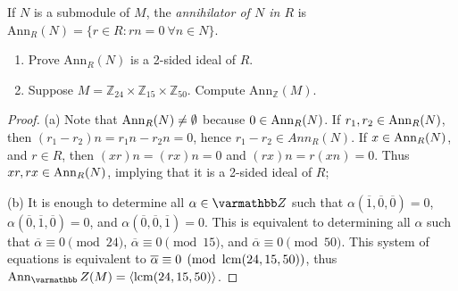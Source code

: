 \documentclass[10pt,oneside,openany]{memoir}
\begin{document}
\begin{exercise}
	If $N$ is a submodule of $M$, the \textit{annihilator of $N$ in $R$} is
$\mathrm{Ann}_R(N)=\{r\in R:rn=0\ \forall n\in N\}$.
	\mbox{}
	\begin{enumerate}[label = (\alph*),itemsep=1pt,topsep=3pt]
		\item Prove $\mathrm{Ann}_R(N)$ is a 2-sided ideal of $R$. 
		\item Suppose $M=\mathbb{Z}_{24}\times\mathbb{Z}_{15}\times\mathbb{Z}_{50}$. Compute $\mathrm{Ann}_{\mathbb{Z}}(M)$.
	\end{enumerate}
\end{exercise}
{\color{blue}

	\begin{proof}
		(a) Note that $\operatorname{Ann}_R(N) \neq \emptyset$ because $0 \in \operatorname{Ann}_R(N)$. If $r_1,r_2 \in \operatorname{Ann}_R(N)$, then $(r_1 - r_2)n = r_1n - r_2n = 0$, hence $r_1 - r_2 \in Ann_R(N)$. If $x \in \operatorname{Ann}_R(N)$, and $r \in R$, then $(xr)n = (rx)n = 0$ and $(rx)n =  r(xn) = 0$. Thus $xr,rx \in \operatorname{Ann}_R(N)$, implying that it is a 2-sided ideal of $R$;

		(b) It is enough to determine all $\alpha \in \bfZ$ such that $\alpha(\overline{1},\overline{0},\overline{0}) = 0$, $\alpha(\overline{0},\overline{1},\overline{0}) = 0$, and $\alpha(\overline{0},\overline{0},\overline{1}) = 0$. This is equivalent to determining all $\alpha$ such that $\overline{\alpha} \equiv 0 \pmod{24}$, $\overline{\alpha}\equiv 0\pmod{15}$, and $\overline{\alpha}\equiv 0 \pmod{50}$. This system of equations is equivalent to $\overline{\alpha} \equiv 0 \pmod{\operatorname{lcm}(24,15,50)}$, thus $\Ann_\bfZ(M) = \left<\lcm(24,15,50) \right>$.
	\end{proof}
}
\end{document}
